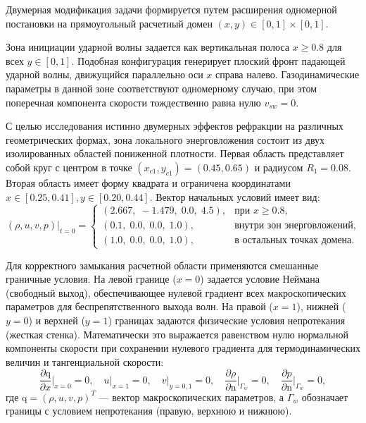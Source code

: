 \documentclass[a4paper,14pt]{extarticle}
\theoremstyle{theorem}
\theoremstyle{lemma}
\begin{document}
Двумерная модификация задачи формируется путем расширения одномерной постановки на прямоугольный расчетный домен $(x, y) \in [0, 1] \times [0, 1]$. 

Зона инициации ударной волны задается как вертикальная полоса $x \ge 0.8$ для всех $y \in [0, 1]$. Подобная конфигурация генерирует плоский фронт падающей ударной волны, движущийся параллельно оси $x$ справа налево. Газодинамические параметры в данной зоне соответствуют одномерному случаю, при этом поперечная компонента скорости тождественно равна нулю $v_{sw} = 0$.

С целью исследования истинно двумерных эффектов рефракции на различных геометрических формах, зона локального энерговложения состоит из двух изолированных областей пониженной плотности. Первая область представляет собой круг с центром в точке $(x_{c1}, y_{c1}) = (0.45, 0.65)$ и радиусом $R_1 = 0.08$. Вторая область имеет форму квадрата и ограничена координатами $x \in [0.25, 0.41], y \in [0.20, 0.44]$. Вектор начальных условий имеет вид:
\begin{equation}
\label{eq:initial_2d_numbers}
(\rho, u, v, p)\big|_{t=0} = 
\begin{cases} 
(2.667,\; -1.479,\; 0.0,\; 4.5), & \text{при } x \ge 0.8, \\ 
(0.1,\; 0.0,\; 0.0,\; 1.0), & \text{внутри зон энерговложений}, \\
(1.0,\; 0.0,\; 0.0,\; 1.0), & \text{в остальных точках домена.}
\end{cases}
\end{equation}

Для корректного замыкания расчетной области применяются смешанные граничные условия. На левой границе ($x=0$) задается условие Неймана (свободный выход), обеспечивающее нулевой градиент всех макроскопических параметров для беспрепятственного выхода волн. На правой ($x=1$), нижней ($y=0$) и верхней ($y=1$) границах задаются физические условия непротекания (жесткая стенка). Математически это выражается равенством нулю нормальной компоненты скорости при сохранении нулевого градиента для термодинамических величин и тангенциальной скорости:
\begin{equation}
\label{eq:bc_2d}
\frac{\partial \mathrm{q}}{\partial x}\bigg|_{x=0} = 0, \quad u\big|_{x=1} = 0, \quad v\big|_{y=0, 1} = 0, \quad \frac{\partial \rho}{\partial \mathrm{n}}\bigg|_{\Gamma_{w}} = 0, \quad \frac{\partial p}{\partial \mathrm{n}}\bigg|_{\Gamma_{w}} = 0,
\end{equation}
где $\mathrm{q} = (\rho, u, v, p)^T$ — вектор макроскопических параметров, а $\Gamma_{w}$ обозначает границы с условием непротекания (правую, верхнюю и нижнюю). 
\end{document}

